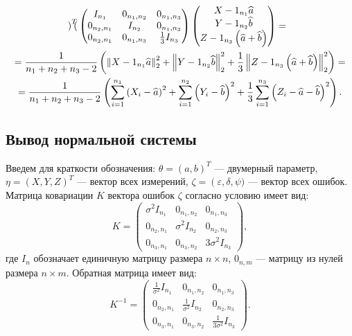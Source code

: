 \begin{multline}
\begin{pmatrix}
    \end{pmatrix}^T
    \begin{pmatrix}
        I_{n_1}     & 0_{n_1,n_2}  & 0_{n_1, n_3}        \\
        0_{n_2,n_1} & I_{n_2}      & 0_{n_1, n_3}        \\
        0_{n_2,n_1} & 0_{n_1, n_3} & \frac{1}{3} I_{n_3}
    \end{pmatrix}
    \begin{pmatrix}
        X - 1_{n_1} \widehat{a} \\
        Y - 1_{n_2} \widehat{b} \\
        Z - 1_{n_3} \left ( \widehat{a} + \widehat{b} \right )
    \end{pmatrix} = \\
    = \frac{1}{n_1 + n_2 + n_3 - 2}
    \left (
    \left \| {X - 1_{n_1} \widehat{a}} \right \|_2^2
    + \left \| {Y - 1_{n_2} \widehat{b}} \right \|_2^2
    + \frac{1}{3} \left \| {Z - 1_{n_3} \left ( \widehat{a} + \widehat{b} \right )} \right \|_2^2
    \right ) = \\
    = \frac{1}{n_1 + n_2 + n_3 - 2}
    \left (
    \sum_{i=1}^{n_1} \left ( X_i - \widehat{a} \right )^2
    + \sum_{i=1}^{n_2} \left ( Y_i - \widehat{b} \right )^2
    + \frac{1}{3} \sum_{i=1}^{n_3} \left ( Z_i - \widehat{a} - \widehat{b} \right )^2
    \right ) .
\end{multline}

\subsection*{Вывод нормальной системы}

Введем для краткости обозначения: $\theta = \left ( a, b \right )^T$ --- двумерный параметр, $\eta = \left ( X, Y, Z \right )^T$ --- вектор всех измерений,
$\zeta = \left ( \varepsilon, \delta, \psi )$ --- вектор всех ошибок. Матрица ковариации $K$ вектора ошибок $\zeta$ согласно условию имеет вид:
\begin{equation}
    K
    =
    \begin{pmatrix}
        \sigma^2 I_{n_1} & 0_{n_1,n_2}      & 0_{n_1,n_3}        \\
        0_{n_2,n_1}      & \sigma^2 I_{n_2} & 0_{n_2,n_3}        \\
        0_{n_3,n_1}      & 0_{n_3,n_2}      & 3 \sigma^2 I_{n_3}
    \end{pmatrix} ,
\end{equation}
где $I_n$ обозначает единичную матрицу размера $n \times n$, $0_{n,m}$ --- матрицу из нулей размера $n \times m$. Обратная матрица имеет вид:
\begin{equation}
    K^{-1}
    =
    \begin{pmatrix}
        \frac{1}{\sigma^2} I_{n_1} & 0_{n_1,n_2}                & 0_{n_1,n_3}                  \\
        0_{n_2,n_1}                & \frac{1}{\sigma^2} I_{n_2} & 0_{n_2,n_3}                  \\
        0_{n_3,n_1}                & 0_{n_3,n_2}                & \frac{1}{3 \sigma^2} I_{n_3}
    \end{pmatrix} .
\end{equation}

